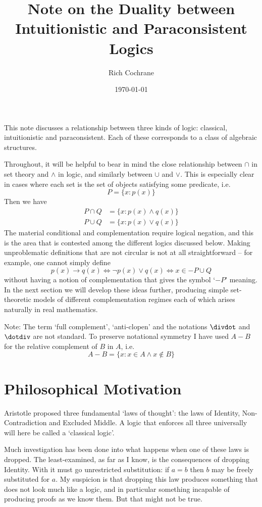 \documentclass[oneside,english]{article}
\theoremstyle{plain}
\theoremstyle{definition}
\theoremstyle{definition}
\begin{document}
	
	\title{Note on the Duality between Intuitionistic and Paraconsistent Logics}
	\author{Rich Cochrane}
	\date{\today}
	\maketitle

This note discusses a relationship between three kinds of logic: classical, intuitionistic and paraconsistent. Each of these corresponds to a class of algebraic structures. 

Throughout, it will be helpful to bear in mind the close relationship between $\cap$ in set theory and $\land$ in logic, and similarly between $\cup$ and $\lor$. This is especially clear in cases where each set is the set of objects satisfying some predicate, i.e.
\[
	P = \{x : p(x)\}
\]
Then we have
\[
	\begin{split}
		P\cap Q & = \{x : p(x)\land q(x)\}\\
		P\cup Q & = \{x : p(x)\lor q(x)\}
	\end{split}
\]
The material conditional and complementation require logical negation, and this is the area that is contested among the different logics discussed below. Making unproblematic definitions that are not circular is not at all straightforward -- for example, one cannot simply define
\[
	p(x)\rightarrow q(x) \Leftrightarrow \lnot p(x)\lor q(x) \Leftrightarrow x\in -P\cup Q
\]
without having a notion of complementation that gives the symbol `$-P$' meaning. In the next section we will develop these ideas further, producing simple set-theoretic models of different complementation regimes each of which arises naturally in real mathematics.

Note: The term `full complement', `anti-clopen' and the notations $\divdot$ and $\dotdiv$ are not standard. To preserve notational symmetry I have used $A-B$ for the relative complement of $B$ in $A$, i.e.
\[
	A-B = \{x : x\in A\land x\notin B \}
\]

\section{Philosophical Motivation}

Aristotle proposed three fundamental `laws of thought': the laws of Identity, Non-Contradiction and Excluded Middle. A logic that enforces all three universally will here be called a `classical logic'.

Much investigation has been done into what happens when one of these laws is dropped. The least-examined, as far as I know, is the consequences of dropping Identity. With it must go unrestricted substitution: if $a=b$ then $b$ may be freely substituted for $a$. My suspicion is that dropping this law produces something that does not look much like a logic, and in particular something incapable of producing proofs as we know them. But that might not be true.
\end{document}
